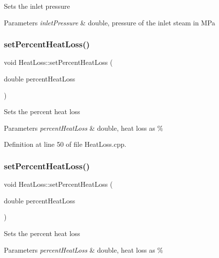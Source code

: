 Sets the inlet pressure 
\begin{DoxyParams}{Parameters}
{\em inlet\+Pressure} & double, pressure of the inlet steam in M\+Pa \\
\hline
\end{DoxyParams}
\mbox{\label{class_heat_loss_a2a4a80b16c1f975e194ae466b20d46bd}} 
\subsubsection{\texorpdfstring{set\+Percent\+Heat\+Loss()}{setPercentHeatLoss()}\hspace{0.1cm}{\footnotesize\ttfamily [1/3]}}
{\footnotesize\ttfamily void Heat\+Loss\+::set\+Percent\+Heat\+Loss (\begin{DoxyParamCaption}\item[{double}]{percent\+Heat\+Loss }\end{DoxyParamCaption})}

Sets the percent heat loss 
\begin{DoxyParams}{Parameters}
{\em percent\+Heat\+Loss} & double, heat loss as \% \\
\hline
\end{DoxyParams}


Definition at line 50 of file Heat\+Loss.\+cpp.

\mbox{\label{class_heat_loss_a2a4a80b16c1f975e194ae466b20d46bd}} 
\subsubsection{\texorpdfstring{set\+Percent\+Heat\+Loss()}{setPercentHeatLoss()}\hspace{0.1cm}{\footnotesize\ttfamily [2/3]}}
{\footnotesize\ttfamily void Heat\+Loss\+::set\+Percent\+Heat\+Loss (\begin{DoxyParamCaption}\item[{double}]{percent\+Heat\+Loss }\end{DoxyParamCaption})}

Sets the percent heat loss 
\begin{DoxyParams}{Parameters}
{\em percent\+Heat\+Loss} & double, heat loss as \% \\
\hline
\end{DoxyParams}
\mbox{\label{class_heat_loss_a2a4a80b16c1f975e194ae466b20d46bd}} 
